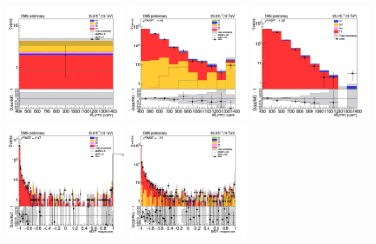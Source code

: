 \begin{figure}[tbp]
  \begin{center}
    \includegraphics[width=0.31\textwidth]{figures/mm_900_july20/hhMt_mm_SR_FullPostfit_plot_july20.png}
    \includegraphics[width=0.31\textwidth]{figures/mm_900_july20/hhMt_mm_CRDY_FullPostfit_plot_july20.png}
    \includegraphics[width=0.31\textwidth]{figures/mm_900_july20/hhMt_mm_CRTT_FullPostfit_plot_july20.png}\\
    \includegraphics[width=0.31\textwidth]{figures/mm_900_july20/bdt_response_mm_SR_FullPostfit_plot_july20.png}
    \includegraphics[width=0.31\textwidth]{figures/mm_900_july20/bdt_response_mm_CRDY_FullPostfit_plot_july20.png}

\end{center}
\end{figure}
